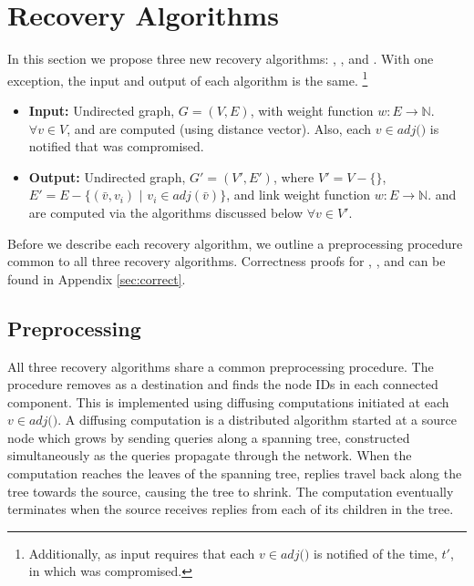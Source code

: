 \section{Recovery Algorithms}
\label{sec:algs}

In this section we propose three new recovery algorithms: \seconds, \purges, and \cprs.  
With one exception, the input and output of each algorithm is the same. 
{\footnote {\small Additionally, as input \cpr requires that each $v \in adj($\bads$)$ is notified of the time, $t'$, in which \bad was compromised.}}
\begin{itemize}
	\item {\bf Input:}  Undirected graph, $G=(V,E)$, with weight function $w: E \rightarrow \mathbb{N}$.  $\forall v \in V$,  \minvv and \dmatrixv are computed
(using distance vector). Also, each $v \in adj($\bads$)$ is notified that \bad was compromised.

	\item {\bf Output:} Undirected graph, $G'=(V',E')$, where $V' = V -\{$\bads$\}$, $E'=E - \{(\bar{v},v_i)$ $|$ $v_i \in adj(\bar{v}) \}$,
and link weight function $w:E \rightarrow \mathbb{N}$.  \minvv and \dmatrixv are computed via the algorithms discussed below $\forall  v \in V'$. 
\end{itemize}
Before we describe each recovery algorithm, we outline a preprocessing procedure common to all three recovery algorithms. Correctness proofs for \seconds, \purges, and \cpr
can be found in Appendix \ref{sec:correct}.


\subsection{Preprocessing}
\label{subsec:preprocess}
All three recovery algorithms share a common preprocessing procedure.  The procedure removes \bad as a destination and finds the node IDs in each connected component. 
This is implemented using diffusing computations \cite{Dijkstra80} initiated at each $v \in adj($\bads$)$. 
A diffusing computation is a distributed algorithm started at a source
node which grows by sending queries along a spanning tree, constructed
simultaneously as the queries propagate through the network.  When the computation reaches the leaves
of the spanning tree, replies travel back along the tree towards the
source, causing the tree to shrink. The computation eventually terminates when the
source receives replies from each of its children in the tree. 

